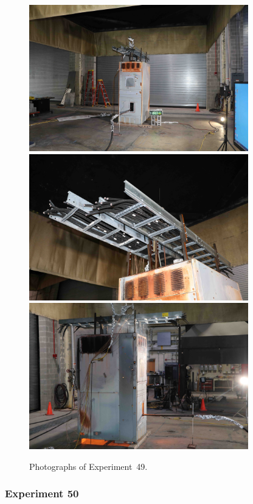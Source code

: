 \begin{figure}[p]
\centering
\includegraphics[height=2.50in]{../FIGURES/Test_49_setup} \\
\includegraphics[height=2.50in]{../FIGURES/Test_49_cables} \\
\includegraphics[height=2.50in]{../FIGURES/Test_49_fire}
\caption[Photographs of Experiment~49]{Photographs of Experiment~49.}
\label{fig:Test_49_photos}
\end{figure}


\clearpage

\subsubsection{Experiment 50}

